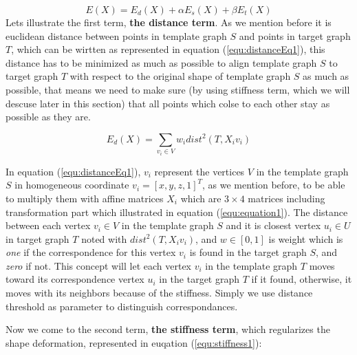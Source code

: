 \documentclass[../structure.tex]{subfiles}
\begin{document}
\begin{equation}
E(X) = E_{d}(X) + \alpha E_{s}(X) + \beta E_{t}(X)
\label{equ:costFun}
\end{equation}
Lets illustrate the first term, \textbf{the distance term}. As we mention before it is euclidean distance between points in template graph $S$ and points in target graph $T$, which can be wirtten as represented in equation (\ref{equ:distanceEq1}), this distance has to be minimized as much as possible to align template graph $S$ to target graph $T$ with respect to the original shape of template graph $S$ as much as possible, that means we need to make sure (by using stiffness term, which we will descuse later in this section) that all points which colse to each other stay as possible as they are.

\begin{equation}
E_{d}(X) = \sum_{v_{i} \in V} w_{i}dist^2(T,X_{i}v_{i})
\label{equ:distance1}
\end{equation}

In equation (\ref{equ:distanceEq1}), $v_{i}$ represent the vertices $V$ in the template graph $S$ in homogeneous coordinate $v_{i} = [x,y,z,1]^T$, as we mention before, to be able to multiply them with affine matrices $X_{i}$ which are $3 \times 4$ matrices including transformation part which illustrated in equation (\ref{equ:equation1}). The distance between each vertex $v_{i} \in V$ in the template graph $S$ and it is closest vertex $u_{i} \in U$ in target graph $T$ noted with $dist^2(T,X_{i}v_{i})$, and $w \in [0,1]$ is weight which is \textit{one} if the correspondence for this vertex $v_{i}$ is found in the target graph $S$, and \textit{zero} if not. This concept will let each vertex $v_{i}$ in the template graph $T$ moves toward its correspondence vertex $u_{i}$ in the target graph $T$ if it found, otherwise, it moves with its neighbors because of the stiffness. Simply we use distance threshold as parameter to distinguish correspondances.

Now we come to the second term, \textbf{the stiffness term}, which regularizes the shape deformation, represented in euqation (\ref{equ:stiffness1}):
\end{document}
